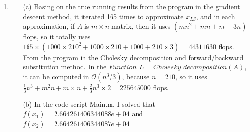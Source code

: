 \documentclass[english,onecolumn]{IEEEtran}
\begin{document}
\begin{enumerate}
\item
\begin{enumerate}
        \item[(a)] Basing on the true running results from the program in the gradient descent method, it iterated 165 times to approximate $x_{LS}$, and in each approximation, if $A$ is $m\times n$ matrix, then it uses $(mn^2+mn+m+3n)$ flops, so it totally uses $165\times (1000\times 210^2+1000\times 210+1000+210\times 3)=44311630$ flops.\\
From the program in the Cholesky decomposition and forward/backward substitution method. In the $Function \ \  L=Cholesky\_decomposition(A)$, it can be computed in $\mathcal{O}\left(n^{3} / 3\right)$, because $n=210$, so it uses $\frac{1}{3} n^{3}+m^{2} n+m \times n+\frac{2}{3} n^{3} \times 2=225645000$ flops.

\item[(b)] In the code script Main.m, I solved that $f(x_1)=2.664261406344088e+04$ and $f(x_2)=2.664261406344087e+04$



    \end{enumerate}
\end{enumerate}

\newpage
\end{document}

